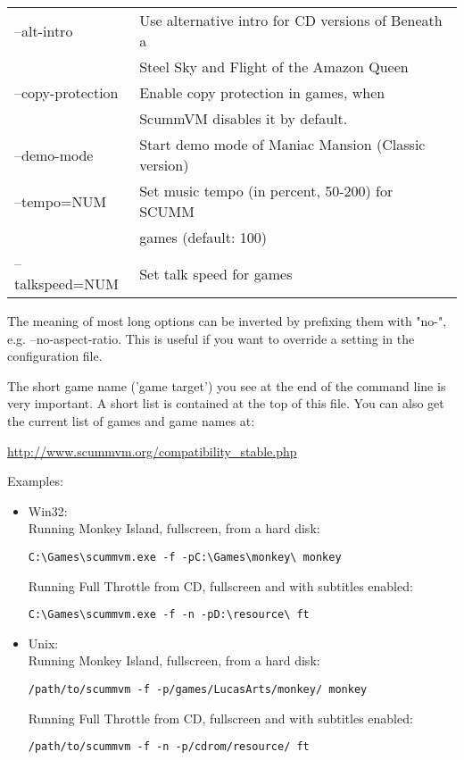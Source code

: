 \begin{tabular}{ll}
\\
  --alt-intro             &Use alternative intro for CD versions of Beneath a\\
                          &Steel Sky and Flight of the Amazon Queen\\
  --copy-protection       &Enable copy protection in games, when\\
                          &ScummVM disables it by default.\\
  --demo-mode             &Start demo mode of Maniac Mansion (Classic version)\\
  --tempo=NUM             &Set music tempo (in percent, 50-200) for SCUMM\\
                          &games (default: 100)\\
  --talkspeed=NUM         &Set talk speed for games\\
\end{tabular}

The meaning of most long options can be inverted by prefixing them with "no-",
e.g. --no-aspect-ratio. This is useful if you want to override a setting in the
configuration file.

The short game name ('game target') you see at the end of the command
line is very important. A short list is contained at the top of this
file. You can also get the current list of games and game names at:

  \url{http://www.scummvm.org/compatibility_stable.php}

Examples:
\begin{itemize}
\item Win32:\\
Running Monkey Island, fullscreen, from a hard disk:
\begin{verbatim}
C:\Games\scummvm.exe -f -pC:\Games\monkey\ monkey
\end{verbatim}
  Running Full Throttle from CD, fullscreen and with subtitles enabled:
\begin{verbatim}
C:\Games\scummvm.exe -f -n -pD:\resource\ ft
\end{verbatim}
 \item Unix:\\
  Running Monkey Island, fullscreen, from a hard disk:
\begin{verbatim}
/path/to/scummvm -f -p/games/LucasArts/monkey/ monkey
\end{verbatim}
  Running Full Throttle from CD, fullscreen and with subtitles enabled:
\begin{verbatim}
/path/to/scummvm -f -n -p/cdrom/resource/ ft
\end{verbatim}
\end{itemize}


